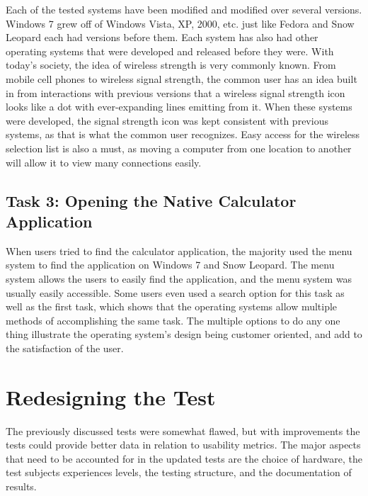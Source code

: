\documentclass[11pt,letterpaper]{report}
\begin{document}
Each of the tested systems have been modified and modified over several versions. Windows 7 grew off of Windows Vista, XP, 2000, etc. just like Fedora and Snow Leopard each had versions before them. Each system has also had other operating systems that were developed and released before they were. With today's society, the idea of wireless strength is very commonly known. From mobile cell phones to wireless signal strength, the common user has an idea built in from interactions with previous versions that a wireless signal strength icon looks like a dot with ever-expanding lines emitting from it. When these systems were developed, the signal strength icon was kept consistent with previous systems, as that is what the common user recognizes. Easy access for the wireless selection list is also a must, as moving a computer from one location to another will allow it to view many connections easily. 

\section{Task 3: Opening the Native Calculator Application}
When users tried to find the calculator application, the majority used the menu system to find the application on Windows 7 and Snow Leopard. The menu system allows the users to easily find the application, and the menu system was usually easily accessible. Some users even used a search option for this task as well as the first task, which shows that the operating systems allow multiple methods of accomplishing the same task. The multiple options to do any one thing illustrate the operating system's design being customer oriented, and add to the satisfaction of the user.

\chapter{Redesigning the Test}
The previously discussed tests were somewhat flawed, but with improvements the tests could provide better data in relation to usability metrics. The major aspects that need to be accounted for in the updated tests are the choice of hardware, the test subjects experiences levels, the testing structure, and the documentation of results.
\end{document}
